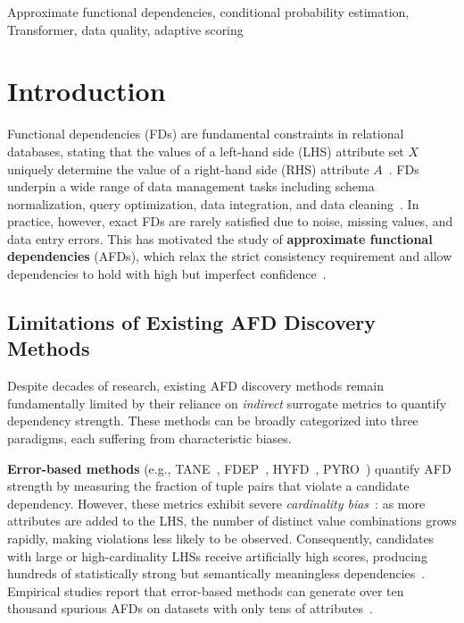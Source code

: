 \documentclass[conference]{IEEEtran}
\begin{document}
\begin{IEEEkeywords}
Approximate functional dependencies, conditional probability estimation, Transformer, data quality, adaptive scoring
\end{IEEEkeywords}

\section{Introduction}\label{sec:intro}

Functional dependencies (FDs) are fundamental constraints in relational databases, stating that the values of a left-hand side (LHS) attribute set $X$ uniquely determine the value of a right-hand side (RHS) attribute $A$~\cite{tane,fastfd}. FDs underpin a wide range of data management tasks including schema normalization, query optimization, data integration, and data cleaning~\cite{afd_survey}. In practice, however, exact FDs are rarely satisfied due to noise, missing values, and data entry errors. This has motivated the study of \textbf{approximate functional dependencies} (AFDs), which relax the strict consistency requirement and allow dependencies to hold with high but imperfect confidence~\cite{tane,pyro,afd_survey}.

\subsection*{Limitations of Existing AFD Discovery Methods}

Despite decades of research, existing AFD discovery methods remain fundamentally limited by their reliance on \emph{indirect} surrogate metrics to quantify dependency strength. These methods can be broadly categorized into three paradigms, each suffering from characteristic biases.

\textbf{Error-based methods} (e.g., TANE~\cite{tane}, FDEP~\cite{fdep}, HYFD~\cite{hyfd}, PYRO~\cite{pyro}) quantify AFD strength by measuring the fraction of tuple pairs that violate a candidate dependency. However, these metrics exhibit severe \emph{cardinality bias}~\cite{measure_study,fdx}: as more attributes are added to the LHS, the number of distinct value combinations grows rapidly, making violations less likely to be observed. Consequently, candidates with large or high-cardinality LHSs receive artificially high scores, producing hundreds of statistically strong but semantically meaningless dependencies~\cite{measure_study}. Empirical studies report that error-based methods can generate over ten thousand spurious AFDs on datasets with only tens of attributes~\cite{afd_survey}.
\end{document}
